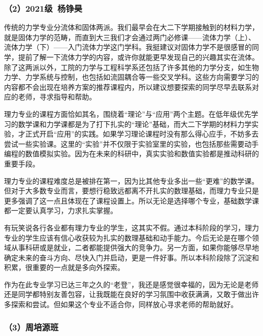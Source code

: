 \documentclass[11pt,oneside]{book}
\begin{document}
\subsubsection{（2）2021级\ 杨铮昊}

传统的力学专业分流体和固体两派。我们最早会在大二下学期接触到的材料力学，就是固体力学的范畴，而直到大三我们才会通过两门必修课——流体力学（上）、流体力学（下）——入门流体力学这门学科。我挺建议对固体力学不是很感冒的同学，提前了解一下流体力学的内容，或许你就能更早发现自己的兴趣其实在流体。除了这两派以外，工院的力学与工程科学系还包括了许多其他的力学分支，如生物力学、力学系统与控制，也包括如流固耦合等一些交叉学科。这些方向需要学习的内容都不会出现在培养方案的推荐课程内，所以建议想要探索的同学尽早去联系对应的老师，寻求指导和帮助。

\vspace{10pt}

理力专业的课程方面恰如其名，围绕着“理论”与“应用”两个主题。在低年级优先学习的数学课和力学课都是为了打下扎实的“理论”基础，而大二下学期的材料力学实验，才正式开启“应用”的实践。如果学习理论课程时没有那么得心应手，不妨多去尝试一些实验课。这里的“实验”并不仅限于实验室里的实验，也包括那些需要动手编程的数值模拟实验。因为在未来的科研中，真实实验和数值实验都是推动科研的重要手段。

\vspace{10pt}

理力专业的课程难度总是被排在第一，因为比其他专业多出一些“更难”的数学课。但对于大多数专业而言，要想行稳致远都离不开扎实的数理基础，而理力专业只是更多强调了这一点且体现在了课程设置上。所以无论是选择哪个专业，基础数学课都一定要认真学习，力求扎实掌握。

\vspace{10pt}

有玩笑说各行各业都有理力专业的学生，这其实不假。通过本科阶段的学习，理力专业的学生应该有信心收获较为扎实的数理基础和动手能力。今后无论是在哪个领域从事科研或是就业，二者都能提供强大的竞争力。另一方面，如果你能够尽早地确定未来的奋斗方向、尽快入门并启动，更是一件好事。所以本科阶段除了沉淀和积累，很重要的一点就是多向外探索。

\vspace{10pt}

作为在此专业学习已达三年之久的“老登”，我还是感觉很幸福的，因为无论是老师还是同学都特别友善包容，让我既能在良好的学习氛围中收获满满，又敢于做出许多探索和尝试。但如果这个专业不适合你，同样放心寻求老师的帮助就好。

\subsubsection{（3）周培源班}
\end{document}

